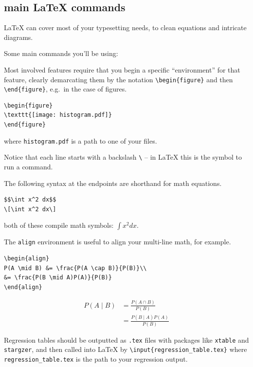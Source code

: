 \documentclass[]{book}
\theoremstyle{definition}
\theoremstyle{definition}
\theoremstyle{definition}
\theoremstyle{remark}
\begin{document}
\subsection{main LaTeX commands}\label{main-latex-commands}

LaTeX can cover most of your typesetting needs, to clean equations and
intricate diagrams.

Some main commands you'll be using:

Most involved features require that you begin a specific ``environment''
for that feature, clearly demarcating them by the notation
\texttt{\textbackslash{}begin\{figure\}} and then
\texttt{\textbackslash{}end\{figure\}}, e.g.~in the case of figures.

\begin{verbatim}
\begin{figure}
\texttt{[image: histogram.pdf]}
\end{figure}
\end{verbatim}

where \texttt{histogram.pdf} is a path to one of your files.

Notice that each line starts with a backslash \texttt{\textbackslash{}}
-- in LaTeX this is the symbol to run a command.

The following syntax at the endpoints are shorthand for math equations.

\begin{verbatim}
$$\int x^2 dx$$
\[\int x^2 dx\]
\end{verbatim}

both of these compile math symbols: \(\displaystyle \int x^2 dx.\)

The \texttt{align} environment is useful to align your multi-line math,
for example.

\begin{verbatim}
\begin{align}
P(A \mid B) &= \frac{P(A \cap B)}{P(B)}\\
&= \frac{P(B \mid A)P(A)}{P(B)}
\end{align}
\end{verbatim}

\begin{align}
P(A \mid B) &= \frac{P(A \cap B)}{P(B)}\\
&= \frac{P(B \mid A)P(A)}{P(B)}
\end{align}

Regression tables should be outputted as \texttt{.tex} files with
packages like \texttt{xtable} and \texttt{stargzer}, and then called
into LaTeX by \texttt{\textbackslash{}input\{regression\_table.tex\}}
where \texttt{regression\_table.tex} is the path to your regression
output.
\end{document}
